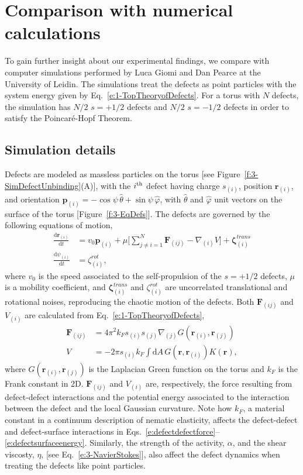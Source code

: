 \section{Comparison with numerical calculations}
To gain further insight about our experimental findings, we compare with computer simulations performed by Luca Giomi and Dan Pearce at the University of Leidin.
The simulations treat the defects as point particles with the system energy given by Eq.~\ref{e:1-TopTheoryofDefects}.
For a torus with $N$ defects, the simulation has $N/2$ $s = +1/2$ defects and $N/2$ $s = -1/2$ defects in order to satisfy the Poincar\'e-Hopf Theorem.


\subsection{Simulation details}
Defects are modeled as massless particles on the torus [see Figure~\ref{f:3-SimDefectUnbinding}(A)], with the $i^{\rm th}$ defect having charge $s_{(i)}$, position $\mathbf{r}_{(i)}$, and orientation $\mathbf{p}_{(i)} = -\cos \psi \, \hat{\theta} + \sin \psi \, \hat{\varphi}$, with $\hat{\theta}$ and $\hat{\varphi}$ unit vectors on the surface of the torus [Figure~\ref{f:3-EqDefs}].
The defects are governed by the following equations of motion,
\begin{align}
  \frac{\textrm{d}\mathbf{r}_{(i)}}{\textrm{d}t} &= v_0 \mathbf{p}_{(i)} + \mu \Big [\sum\limits_{j\neq i=1}^N \mathbf{F}_{(ij)} - \nabla_{(i)} V \Big ] + \bm{\zeta}^{trans}_{(i)} \\
    \frac{\textrm{d}\psi_{(i)}}{\textrm{d}t} &= \zeta^{rot}_{(i)},
\end{align}
where $v_0$ is the speed associated to the self-propulsion of the $s = +1/2$ defects, $\mu$ is a mobility coefficient, and $\bm{\zeta}^{trans}_{(i)}$ and $\zeta^{rot}_{(i)}$ are uncorrelated translational and rotational noises, reproducing the chaotic motion of the defects.
Both $\mathbf{F}_{(ij)}$ and $V_{(i)}$ are calculated from Eq.~\ref{e:1-TopTheoryofDefects},
\begin{align}
  \mathbf{F}_{(ij)} &= 4\pi^2 k_F s_{(i)}s_{(j)} \nabla_{(j)} G(\mathbf{r}_{(i)},\mathbf{r}_{(j)})\label{e:defectdefectforce} \\
  V &= - 2 \pi s_{(i)}k_F \int \textrm{d}A\, G(\mathbf{r},\mathbf{r}_{(i)})K(\mathbf{r}),\label{e:defectsurfaceenergy}
\end{align}
where $G(\mathbf{r}_{(i)},\mathbf{r}_{(j)})$ is the Laplacian Green function on the torus and $k_F$ is the Frank constant in 2D.
$\mathbf{F}_{(ij)}$ and $V_{(i)}$ are, respectively, the force resulting from defect-defect interactions and the potential energy associated to the interaction between the defect and the local Gaussian curvature.
Note how $k_F$, a material constant in a continuum description of nematic elasticity, affects the defect-defect and defect-surface interactions in Eqs.~\ref{e:defectdefectforce}--\ref{e:defectsurfaceenergy}.
Similarly, the strength of the activity, $\alpha$, and the shear viscosty, $\eta$, [see Eq.~\ref{e:3-NavierStokes}], also affect the defect dynamics when treating the defects like point particles.

